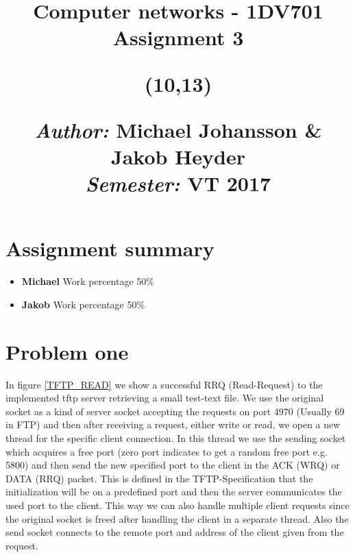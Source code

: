 \documentclass[a4paper,12pt]{article}
\title{	
\vspace{-8cm}
\begin{sidebar}
    \vspace{10cm}
    \normalfont \normalsize
    \vspace{-1.3cm}
\end{sidebar}
\vspace{3cm}
\begin{flushleft}
    \huge Computer networks - 1DV701 \\ 
    \LARGE  Assignment 3\\
\end{flushleft}
\null
\vfill
\begin{textblock}{6}(10,13)
\begin{flushright}
\begin{minipage}{\textwidth}
\begin{flushleft} \large
\emph{Author:} Michael Johansson \& Jakob Heyder\\ %
\emph{Semester:} VT 2017\\ %
\end{flushleft}
\end{minipage}
\end{flushright}
\end{textblock}
}
\date{}
\numberwithin{figure}{section}
\begin{document}
\maketitle
\clearpage


\newpage
{}
\tableofcontents %
\newpage
{}

%
%

\section{Assignment summary}

\begin{itemize}
\item\textbf{Michael}
Work percentage 50\%

\item\textbf{Jakob} 
Work percentage 50\%
\end{itemize}



\newpage

\section{Problem one}

In figure \ref{TFTP_READ} we show a successful RRQ (Read-Request) to the implemented tftp server retrieving a small test-text file.
\noindent
We use the original socket as a kind of server socket accepting the requests on port 4970 (Usually 69 in FTP) and then after receiving a request, either write or read, we open a new thread for the specific client connection. In this thread we use the sending socket which acquires a free port (zero port indicates to get a random free port e.g. 5800) and then send the new specified port to the client in the ACK (WRQ) or DATA (RRQ) packet.  This is defined in the TFTP-Specification that the initialization will be on a predefined port and then the server communicates the used port to the client. This way we can also handle multiple client requests since the original socket is freed after handling the client in a separate thread. Also the send socket connects to the remote port and address of the client given from the request.
\end{document}
